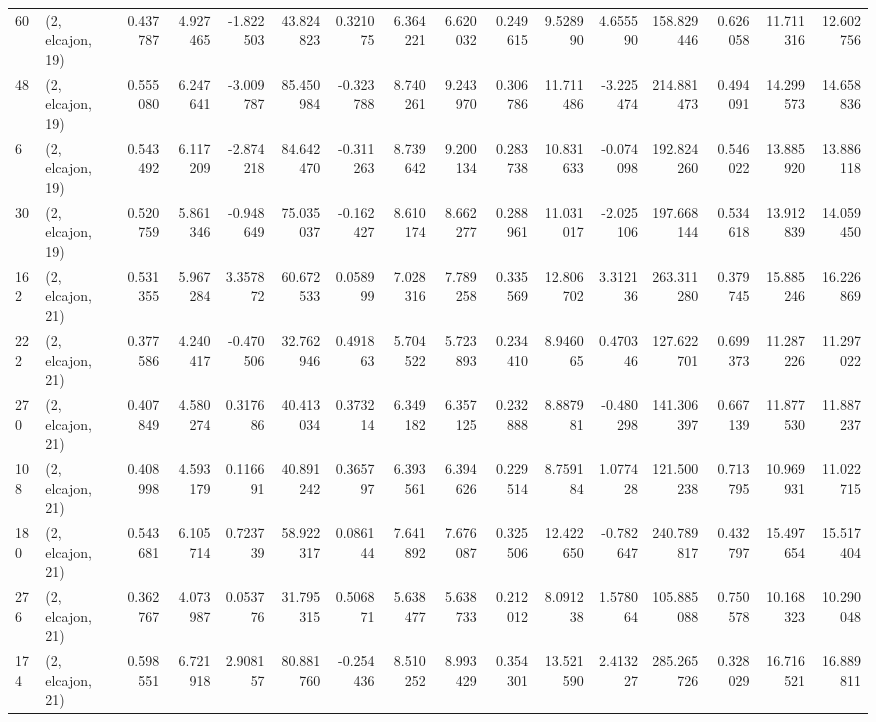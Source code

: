 \begin{tabular}{llrrrrrrrrrrrrrr}
60  &  (2, elcajon, 19) &   0.437787 &   4.927465 &  -1.822503 &    43.824823 &   0.321075 &   6.364221 &   6.620032 &  0.249615 &   9.528990 &   4.655590 &   158.829446 &  0.626058 &  11.711316 &  12.602756 \\
48  &  (2, elcajon, 19) &   0.555080 &   6.247641 &  -3.009787 &    85.450984 &  -0.323788 &   8.740261 &   9.243970 &  0.306786 &  11.711486 &  -3.225474 &   214.881473 &  0.494091 &  14.299573 &  14.658836 \\
6   &  (2, elcajon, 19) &   0.543492 &   6.117209 &  -2.874218 &    84.642470 &  -0.311263 &   8.739642 &   9.200134 &  0.283738 &  10.831633 &  -0.074098 &   192.824260 &  0.546022 &  13.885920 &  13.886118 \\
30  &  (2, elcajon, 19) &   0.520759 &   5.861346 &  -0.948649 &    75.035037 &  -0.162427 &   8.610174 &   8.662277 &  0.288961 &  11.031017 &  -2.025106 &   197.668144 &  0.534618 &  13.912839 &  14.059450 \\
162 &  (2, elcajon, 21) &   0.531355 &   5.967284 &   3.357872 &    60.672533 &   0.058999 &   7.028316 &   7.789258 &  0.335569 &  12.806702 &   3.312136 &   263.311280 &  0.379745 &  15.885246 &  16.226869 \\
222 &  (2, elcajon, 21) &   0.377586 &   4.240417 &  -0.470506 &    32.762946 &   0.491863 &   5.704522 &   5.723893 &  0.234410 &   8.946065 &   0.470346 &   127.622701 &  0.699373 &  11.287226 &  11.297022 \\
270 &  (2, elcajon, 21) &   0.407849 &   4.580274 &   0.317686 &    40.413034 &   0.373214 &   6.349182 &   6.357125 &  0.232888 &   8.887981 &  -0.480298 &   141.306397 &  0.667139 &  11.877530 &  11.887237 \\
108 &  (2, elcajon, 21) &   0.408998 &   4.593179 &   0.116691 &    40.891242 &   0.365797 &   6.393561 &   6.394626 &  0.229514 &   8.759184 &   1.077428 &   121.500238 &  0.713795 &  10.969931 &  11.022715 \\
180 &  (2, elcajon, 21) &   0.543681 &   6.105714 &   0.723739 &    58.922317 &   0.086144 &   7.641892 &   7.676087 &  0.325506 &  12.422650 &  -0.782647 &   240.789817 &  0.432797 &  15.497654 &  15.517404 \\
276 &  (2, elcajon, 21) &   0.362767 &   4.073987 &   0.053776 &    31.795315 &   0.506871 &   5.638477 &   5.638733 &  0.212012 &   8.091238 &   1.578064 &   105.885088 &  0.750578 &  10.168323 &  10.290048 \\
174 &  (2, elcajon, 21) &   0.598551 &   6.721918 &   2.908157 &    80.881760 &  -0.254436 &   8.510252 &   8.993429 &  0.354301 &  13.521590 &   2.413227 &   285.265726 &  0.328029 &  16.716521 &  16.889811 \\

\end{tabular}
